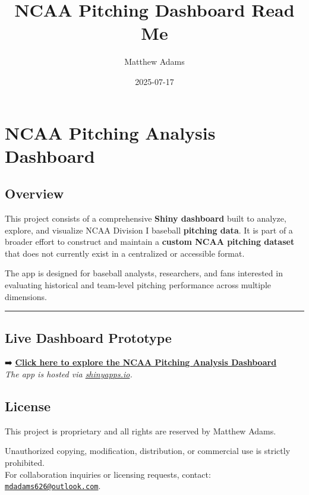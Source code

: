 \documentclass[
]{article}
\title{NCAA Pitching Dashboard Read Me}
\author{Matthew Adams}
\date{2025-07-17}
\begin{document}
\maketitle

\section{NCAA Pitching Analysis
Dashboard}\label{ncaa-pitching-analysis-dashboard}

\subsection{Overview}\label{overview}

This project consists of a comprehensive \textbf{Shiny dashboard} built
to analyze, explore, and visualize NCAA Division I baseball
\textbf{pitching data}. It is part of a broader effort to construct and
maintain a \textbf{custom NCAA pitching dataset} that does not currently
exist in a centralized or accessible format.

The app is designed for baseball analysts, researchers, and fans
interested in evaluating historical and team-level pitching performance
across multiple dimensions.

\begin{center}\rule{0.5\linewidth}{0.5pt}\end{center}

\subsection{Live Dashboard Prototype}\label{live-dashboard-prototype}

➡️
\textbf{\href{https://matthew-apps.shinyapps.io/baseball_data_analysis/}{Click
here to explore the NCAA Pitching Analysis Dashboard}}\\
\emph{The app is hosted via
\href{https://www.shinyapps.io}{shinyapps.io}.}

\subsection{License}\label{license}

This project is proprietary and all rights are reserved by Matthew
Adams.

Unauthorized copying, modification, distribution, or commercial use is
strictly prohibited.\\
For collaboration inquiries or licensing requests, contact:
\href{mailto:mdadams626@outlook.com}{\nolinkurl{mdadams626@outlook.com}}.
\end{document}
